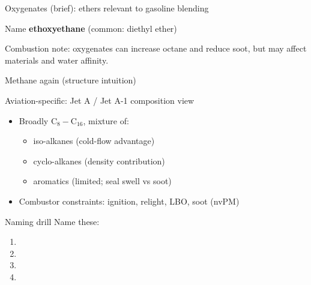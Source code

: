 \documentclass[aspectratio=169]{beamer}
\newcommand{\atom}[4]{%
  \node[circle, draw, fill=white, minimum size=9mm, inner sep=0pt] (#1) at (#2,#3) {\small #4};
}
\newcommand{\bondback}[2]{\draw[black!35, line width=1.2pt] (#1) -- (#2);}
\newcommand{\bondfront}[2]{\draw[black, line width=1.6pt] (#1) -- (#2);}
\begin{document}
\begin{frame}{Oxygenates (brief): ethers relevant to gasoline blending}
\centering
{}

\vspace{2mm}
\begin{block}{Name}
\textbf{ethoxyethane} (common: diethyl ether)
\end{block}

Combustion note: oxygenates can increase octane and reduce soot, but may affect materials and water affinity.
\end{frame}

\begin{frame}{Methane again (structure intuition)}
\centering
{}
\end{frame}

\begin{frame}{Aviation-specific: Jet A / Jet A-1 composition view}
\begin{itemize}
\item Broadly \(\mathrm{C_8\!-\!C_{16}}\), mixture of:
  \begin{itemize}
  \item iso-alkanes (cold-flow advantage)
  \item cyclo-alkanes (density contribution)
  \item aromatics (limited; seal swell vs soot)
  \end{itemize}
\item Combustor constraints: ignition, relight, LBO, soot (nvPM)
\end{itemize}
\end{frame}

\begin{frame}{Naming drill}
Name these:
\begin{enumerate}
\item {}
\item {}
\item {}
\item {}
\end{enumerate}

\vspace{2mm}

\end{frame}
\end{document}
